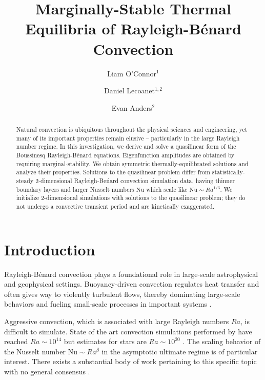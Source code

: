 \documentclass[reprint,amsmath,amssymb,aps]{revtex4-1}
\newcommand\Nu{\mathrm{Nu}}
\begin{document}
\title{Marginally-Stable Thermal Equilibria of Rayleigh-Bénard Convection}

\author{Liam O'Connor$^1$}
\author{Daniel Lecoanet$^{1, 2}$}
\author{Evan Anders$^2$}

\begin{abstract}
Natural convection is ubiquitous throughout the physical sciences and engineering, yet many of its important properties remain elusive -- particularly in the large Rayleigh number regime.
In this investigation, we derive and solve a quasilinear form of the Boussinesq Rayleigh-B\'enard equations. 
Eigenfunction amplitudes are obtained by requiring marginal-stability. We obtain symmetric thermally-equilibrated solutions and analyze their properties. 
Solutions to the quasilinear problem differ from statistically-steady 2-dimensional Rayleigh-Be\'nard convection simulation data, having thinner boundary layers and larger Nusselt numbers $\Nu$ which scale like $\Nu \sim Ra^{1/3}$. 
We initialize 2-dimensional simulations with solutions to the quasilinear problem; they do not undergo a convective transient period and are kinetically exaggerated.
\end{abstract}


\maketitle

\section{Introduction}
Rayleigh-B\'enard convection plays a foundational role in large-scale astrophysical and geophysical settings.
Buoyancy-driven convection regulates heat transfer and often gives way to violently turbulent flows, thereby dominating large-scale behaviors and fueling small-scale processes in important systems \cite{Couston}.

Aggressive convection, which is associated with large Rayleigh numbers $Ra$, is difficult to simulate. 
State of the art convection simulations performed by \cite{Zhu_2018} have reached $Ra \sim 10^{14}$ but estimates for stars are $Ra \sim 10^{20}$ \cite{Ossendrijver}. 
The scaling behavior of the Nusselt number $\Nu \sim Ra^{\beta}$ in the asymptotic ultimate regime is of particular interest.
There exists a substantial body of work pertaining to this specific topic with no general consensus \cite{Malkus_1954, Howard_1966, Kraichnan, Spiegel, Castaing, Grossman, Ahlers}. 
\end{document}
